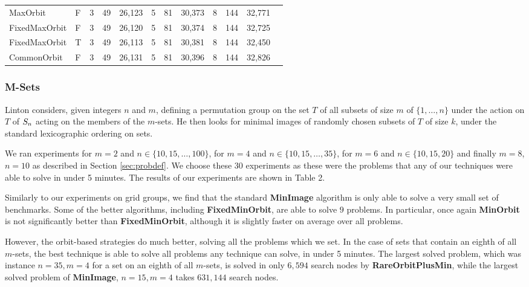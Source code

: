 {\begin{landscape}
\begin{tabular}{|l|l|l|r|r|r|r|r|r|r|r|r|}
MaxOrbit                       & F &   3 &    49 & 26,123&   5 &    81 & 30,373&   8 &   144 & 32,771\\
FixedMaxOrbit                  & F &   3 &    49 & 26,120&   5 &    81 & 30,374&   8 &   144 & 32,725\\
FixedMaxOrbit                  & T &   3 &    49 & 26,113&   5 &    81 & 30,381&   8 &   144 & 32,450\\
CommonOrbit                    & F &   3 &    49 & 26,131&   5 &    81 & 30,396&   8 &   144 & 32,826\\
\hline
\end{tabular}
\label{gridtable}
\end{landscape}
\clearpage%
}

\subsubsection{M-Sets}

Linton \cite{Linton:SmallestImage} considers, given integers \(n\) and \(m\),
defining a permutation group on the set \(T\) of all subsets of size \(m\) of \(\{1,\dots,n\}\)
under the action on \(T\) of \(S_{n}\) acting on the
members of the \(m\)-sets. He then looks for minimal images of randomly chosen
subsets of \(T\) of size \(k\), under the standard lexicographic ordering on sets.

We ran experiments for \(m = 2\) and \(n \in \{10,15,\dots,100\}\),
for \(m = 4\) and \(n \in
\{10,15,\dots,35\}\), for \(m=6\) and \(n \in \{10,15,20\}\) and
finally \(m=8\), \(n=10\) as described in Section \ref{sec:probdef}. We choose these 30
experiments as these were the problems that any of our techniques were able
to solve in under 5 minutes. The results of our experiments are shown in Table 2.

Similarly to our experiments on grid groups, we find that the standard
\textbf{MinImage} algorithm is only able to solve a very small set of benchmarks.
Some of the better algorithms, including \textbf{FixedMinOrbit},
are able to solve \(9\) problems. In particular, once again \textbf{MinOrbit}
is not significantly better than \textbf{FixedMinOrbit}, although it is slightly
faster on average over all problems.

However, the orbit-based strategies do much better, solving all the problems
which we set. In the case of sets that contain an eighth of all \(m\)-sets, the best
technique is able to solve all problems any technique can solve, in under 5
minutes. The largest solved problem, which was instance \(n=35, m=4\) for a set
on an eighth of all \(m\)-sets, is solved in only \(6,594\) search nodes by
\textbf{RareOrbitPlusMin}, while the largest solved problem of \textbf{MinImage},
\(n = 15, m = 4\) takes \(631,144\) search nodes.

